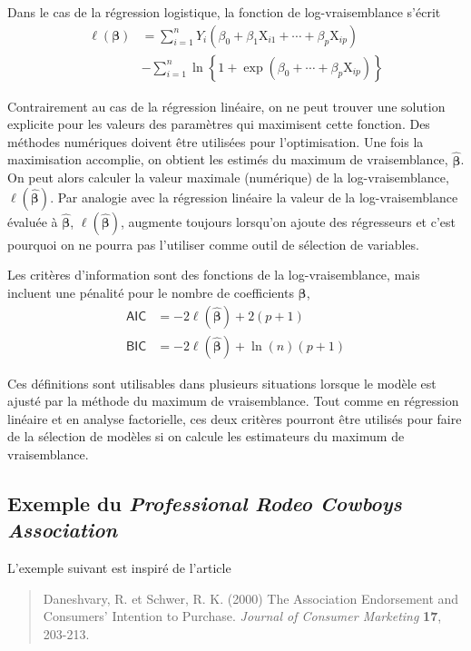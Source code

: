\documentclass[
  11pt,
  letterpaper,
]{scrbook}
\theoremstyle{definition}
\theoremstyle{remark}
\begin{document}
Dans le cas de la régression logistique, la fonction de
log-vraisemblance s'écrit \begin{align*}
 \ell(\boldsymbol{\beta}) &= \sum_{i=1}^n Y_i ( \beta_0 + \beta_1 \mathrm{X}_{i1} + \cdots + \beta_p \mathrm{X}_{ip}) \\&- \sum_{i=1}^n \ln\left\{1+\exp(\beta_0 + \cdots + \beta_p\mathrm{X}_{ip})\right\}
\end{align*}

Contrairement au cas de la régression linéaire, on ne peut trouver une
solution explicite pour les valeurs des paramètres qui maximisent cette
fonction. Des méthodes numériques doivent être utilisées pour
l'optimisation. Une fois la maximisation accomplie, on obtient les
estimés du maximum de vraisemblance, \(\widehat{\boldsymbol{\beta}}\).
On peut alors calculer la valeur maximale (numérique) de la
log-vraisemblance, \(\ell(\widehat{\boldsymbol{\beta}})\). Par analogie
avec la régression linéaire la valeur de la log-vraisemblance évaluée à
\(\widehat{\boldsymbol{\beta}}\),
\(\ell(\widehat{\boldsymbol{\beta}})\), augmente toujours lorsqu'on
ajoute des régresseurs et c'est pourquoi on ne pourra pas l'utiliser
comme outil de sélection de variables.

Les critères d'information sont des fonctions de la log-vraisemblance,
mais incluent une pénalité pour le nombre de coefficients
\(\boldsymbol{\beta}\), \begin{align*}
 \mathsf{AIC} & = -2 \ell(\widehat{\boldsymbol{\beta}}) + 2(p+1)\\
 \mathsf{BIC} & = -2 \ell(\widehat{\boldsymbol{\beta}}) + \ln(n)(p+1)
\end{align*}

Ces définitions sont utilisables dans plusieurs situations lorsque le
modèle est ajusté par la méthode du maximum de vraisemblance. Tout comme
en régression linéaire et en analyse factorielle, ces deux critères
pourront être utilisés pour faire de la sélection de modèles si on
calcule les estimateurs du maximum de vraisemblance.

\subsection{\texorpdfstring{Exemple du \emph{Professional Rodeo Cowboys
Association}}{Exemple du Professional Rodeo Cowboys Association}}\label{sec-cowboy}

L'exemple suivant est inspiré de l'article

\begin{quote}
Daneshvary, R. et Schwer, R. K. (2000) The Association Endorsement and
Consumers' Intention to Purchase. \emph{Journal of Consumer Marketing}
\textbf{17}, 203-213.
\end{quote}
\end{document}
